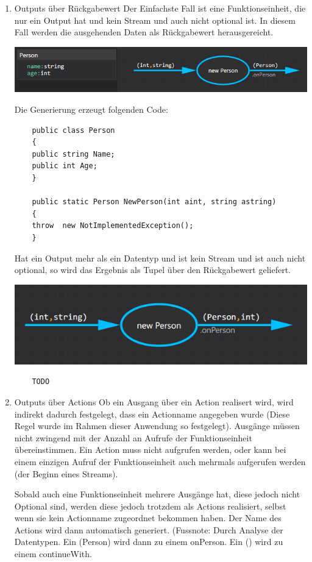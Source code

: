 \begin{enumerate}
	\item Outputs über Rückgabewert
	\label{sec:orgheadline35}
	Der Einfachste Fall ist eine Funktionseinheit, die nur ein Output hat und
	kein Stream und auch nicht optional ist.
	In diesem Fall werden die ausgehenden Daten als Rückgabewert herausgereicht.
	
	\includegraphics[width=.9\linewidth]{./img/roslyn_simpleOutput.png} 
	
	Die Generierung erzeugt folgenden Code:
	\begin{verbatim}
	public class Person
	{
	public string Name;
	public int Age;
	}
	
	public static Person NewPerson(int aint, string astring)
	{
	throw  new NotImplementedException();
	}
	\end{verbatim}
	
	Hat ein Output mehr als ein Datentyp und ist kein Stream und ist auch nicht optional, so
	wird das Ergebnis als Tupel über den Rückgabewert geliefert.
	
	\includegraphics[width=.9\linewidth]{./img/roslyn_twoDatatypesOneOutput.png} 
	
	
	\begin{verbatim}
	TODO
	\end{verbatim}
	
	\item Outputs über Actions
	\label{sec:orgheadline36}
	Ob ein Ausgang über ein Action realisert wird, wird indirekt dadurch
	festgelegt, dass ein Actionname angegeben wurde (Diese Regel wurde im
	Rahmen dieser Anwendung so festgelegt). Ausgänge müssen nicht zwingend mit
	der Anzahl an Aufrufe der Funktionseinheit übereinstimmen. Ein Action muss
	nicht aufgrufen werden, oder kann bei einem einzigen Aufruf der Funktionseinheit auch
	mehrmals aufgerufen werden (der Beginn eines Streams). 
	
	Sobald auch eine Funktionseinheit mehrere Ausgänge hat, diese jedoch nicht
	Optional sind, werden diese jedoch trotzdem als Actions realisiert, selbst wenn sie kein
	Actionname zugeordnet bekommen haben. Der Name des Actions wird dann
	automatisch generiert. (Fussnote: Durch Analyse der Datentypen. Ein
	(Person) wird dann zu einem onPerson. Ein () wird zu einem continueWith. 
	

\end{enumerate}
